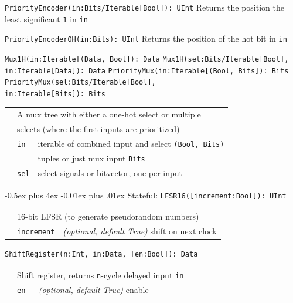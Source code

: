 \documentclass[10pt,landscape]{article}
\makeatletter
\renewcommand{\subsection}{\@startsection{subsection}{2}{0mm}%
                                {-0.5ex plus 4ex}%
                                {-0.01ex plus .01ex}%
                                {\normalfont\normalsize\bfseries}}
\makeatother
\begin{document}
\begin{multicols}{3}
\columnbreak

\verb$PriorityEncoder(in:Bits/Iterable[Bool]): UInt$ \newline
\phantom{x} Returns the position the least significant \verb$1$ in \verb$in$

\verb$PriorityEncoderOH(in:Bits): UInt$ \newline
\phantom{x} Returns the position of the hot bit in \verb$in$

\verb$Mux1H(in:Iterable[(Data, Bool]): Data$ \newline
\verb$Mux1H(sel:Bits/Iterable[Bool],$ \newline
\verb$      in:Iterable[Data]): Data$ \newline
\verb$PriorityMux(in:Iterable[(Bool, Bits]): Bits$ \newline
\verb$PriorityMux(sel:Bits/Iterable[Bool],$ \newline
\verb$                  in:Iterable[Bits]): Bits$ \newline
\begin{tabular}{l l l}
& \multicolumn{2}{l}{A mux tree with either a one-hot select or multiple} \\
& \multicolumn{2}{l}{\phantom{x} selects (where the first inputs are prioritized)} \\
& \verb$in$ & iterable of combined input and select \verb$(Bool, Bits)$ \\
& & tuples or just mux input \verb$Bits$ \\
& \verb$sel$ & select signals or bitvector, one per input \\
\end{tabular}

\subsection{Stateful}: \newline
\verb$LFSR16([increment:Bool]): UInt$ \newline
\begin{tabular}{l l l}
& \multicolumn{2}{l}{16-bit LFSR (to generate pseudorandom numbers)} \\
& \verb$increment$ & {\em(optional, default True)} shift on next clock \\
\end{tabular}

\verb$ShiftRegister(n:Int, in:Data, [en:Bool]): Data$ \newline
\begin{tabular}{l l l}
& \multicolumn{2}{l}{Shift register, returns \texttt{n}-cycle delayed input \texttt{in}} \\
& \verb$en$ & {\em(optional, default True)} enable \\
\end{tabular}


\end{multicols}
\end{document}
